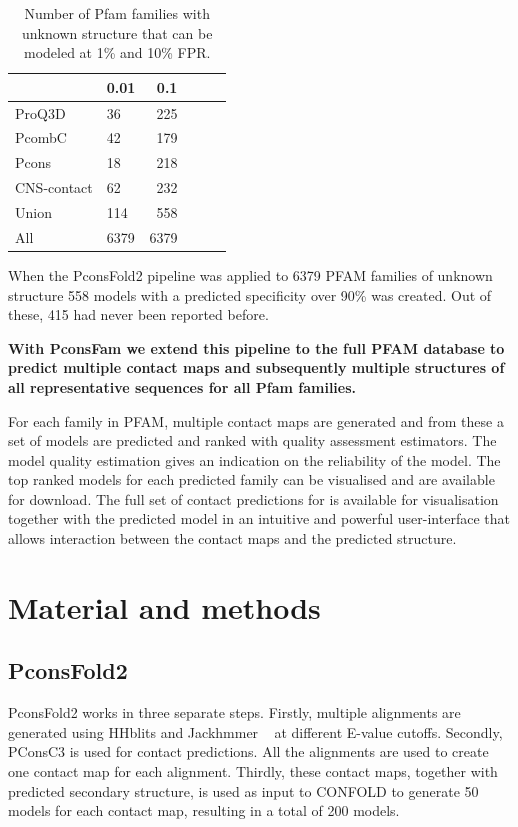 \documentclass[a4,center,fleqn]{NAR}
\begin{document}
\begin{table}[]
\centering
\caption{Number of Pfam families with unknown structure that can be modeled at
1\% and 10\% FPR.}
\label{tab:nopdb1}
    \begin{tabular}{lp{2cm}rp{2cm}rp{2cm}}
  \hline
 & 0.01 & 0.1 \\ 
  \hline
  ProQ3D & 36 & 225 \\ 
  PcombC & 42 & 179 \\ 
  Pcons & 18 & 218 \\ 
  CNS-contact & 62 & 232 \\  \hline 
  Union & 114 & 558 \\ 
  All & 6379 &  6379 \\ 
   \hline
\end{tabular}
\end{table}
When the PconsFold2 pipeline was applied to 6379 PFAM families of
unknown structure 558 models with a predicted specificity over 90\% was
created. Out of these, 415 had never been reported before.

{\bf With
PconsFam we extend this pipeline to the full PFAM database to predict
multiple contact maps and subsequently multiple structures of all
representative sequences for all Pfam families. }

For each family in
PFAM, multiple contact maps are generated and from these a set of
models are predicted and ranked with quality assessment
estimators. The model quality estimation gives an indication on the
reliability of the model. 
\newpage
The top ranked models for each predicted
family can be visualised and are available for download. The full set
of contact predictions for is available for visualisation together
with the predicted model in an intuitive and powerful user-interface
that allows interaction between the contact maps and the predicted
structure. 

\section{Material and methods}
\subsection{PconsFold2}
PconsFold2 works in three separate steps. Firstly, multiple alignments
are generated using HHblits and Jackhmmer ~\cite{eddy22039361} at different 
E-value cutoffs.
Secondly, PConsC3 is used for contact predictions. All the alignments are used to 
create one contact map for each alignment.
Thirdly, these contact maps, together with predicted secondary structure, is used
as input to CONFOLD to generate 50 models for each contact map, resulting in a total
of 200 models.
\end{document}
